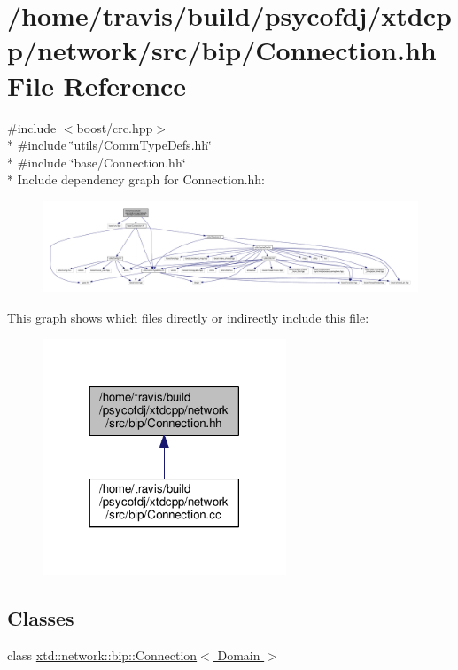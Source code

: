 \hypertarget{bip_2Connection_8hh}{\section{/home/travis/build/psycofdj/xtdcpp/network/src/bip/\-Connection.hh File Reference}
\label{bip_2Connection_8hh}
}
{\ttfamily \#include $<$boost/crc.\-hpp$>$}\\*
{\ttfamily \#include \char`\"{}utils/\-Comm\-Type\-Defs.\-hh\char`\"{}}\\*
{\ttfamily \#include \char`\"{}base/\-Connection.\-hh\char`\"{}}\\*
Include dependency graph for Connection.\-hh\-:
\nopagebreak
\begin{figure}[H]
\begin{center}
\leavevmode
\includegraphics[width=350pt]{bip_2Connection_8hh__incl}
\end{center}
\end{figure}
This graph shows which files directly or indirectly include this file\-:
\nopagebreak
\begin{figure}[H]
\begin{center}
\leavevmode
\includegraphics[width=206pt]{bip_2Connection_8hh__dep__incl}
\end{center}
\end{figure}
\subsection*{Classes}
\begin{DoxyCompactItemize}
\item 
class \hyperlink{classxtd_1_1network_1_1bip_1_1Connection}{xtd\-::network\-::bip\-::\-Connection$<$ Domain $>$}
\end{DoxyCompactItemize}
